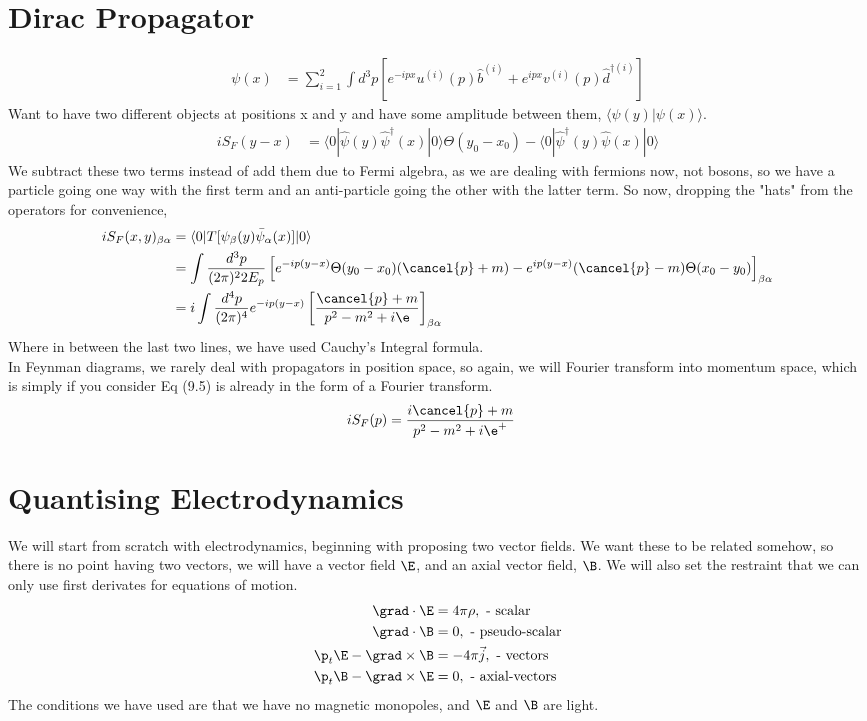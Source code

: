 \documentclass[a4paper, 11pt, normalem]{report}
\newcommand\hpsi{\hat{\psi}}
\begin{document}
\section{Dirac Propagator}
\begin{align}
    \psi(x) &= \sum_{i=1}^2 \int d^3p \left[e^{-ipx}u^{(i)}(p)\hat{b}^{(i)} + e^{ipx}v^{(i)}(p)\hat{d}^{\dagger(i)}\right]
\end{align}
Want to have two different objects at positions x and y and have some amplitude between them, $\langle\psi(y)|\psi(x)\rangle$.
\begin{align}
    iS_F(y-x) &= \langle0|\hpsi(y)\hpsi^\dagger(x)|0\rangle\Theta(y_0-x_0) - \langle0|\hpsi^\dagger(y)\hpsi(x)|0\rangle
\end{align}
We subtract these two terms instead of add them due to Fermi algebra, as we are dealing with fermions now, not bosons, so we have a particle going one way with the first term and an anti-particle going the other with the latter term.
So now, dropping the "hats" from the operators for convenience,
\begin{align}
    iS_F(x,y)_{\beta\alpha} &= \langle0|T[\psi_\beta(y)\bar{\psi}_\alpha(x)]|0\rangle \\
                            &= \int \frac{d^3p}{(2\pi)^22E_p}\left[e^{-ip(y-x)}\Theta(y_0-x_0)(\cancel{p}+m) - e^{ip(y-x)}(\cancel{p}-m)\Theta(x_0-y_0)\right]_{\beta\alpha} \\
                            &= i\int\frac{d^4p}{(2\pi)^4} e^{-ip(y-x)}\left[\frac{\cancel{p}+m}{p^2-m^2+i\e}\right]_{\beta\alpha}
\end{align}
Where in between the last two lines, we have used Cauchy's Integral formula.\\
In Feynman diagrams, we rarely deal with propagators in position space, so again, we will Fourier transform into momentum space, which is simply if you consider Eq (9.5) is already in the form of a Fourier transform.
\begin{align}
    iS_F(p) &= \frac{i\cancel{p}+m}{p^2-m^2+i\e^+}
\end{align}

\section{Quantising Electrodynamics}
We will start from scratch with electrodynamics, beginning with proposing two vector fields.
We want these to be related somehow, so there is no point having two vectors, we will have a vector field $\E$, and an axial vector field, $\B$.
We will also set the restraint that we can only use first derivates for equations of motion.
\begin{align}
    \grad\cdot\E &= 4\pi\rho, \text{ - scalar} \\
    \grad\cdot\B &= 0, \text{ - pseudo-scalar} \\
    \p_t\E - \grad\times\B &= -4\pi\vec{j}, \text{ - vectors} \\
    \p_t\B - \grad\times\E &= 0, \text{ - axial-vectors}
\end{align}
The conditions we have used are that we have no magnetic monopoles, and $\E$ and $\B$ are light.
\end{document}
